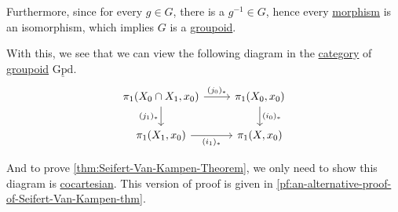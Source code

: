 Furthermore, since for every \(g\in G\), there is a \(g^{-1} \in G\), hence every \hyperref[def:morphism]{morphism} is an isomorphism, which implies \(G\) is a \hyperref[def:groupoid]{groupoid}.

With this, we see that we can view the following diagram in the \hyperref[def:category]{category} of \hyperref[def:groupoid]{groupoid} \(\underline{\mathrm{Gpd}}\).
\[
	\begin{tikzcd}
		{\pi_1(X_0\cap X_1, x_0)} & {\pi_1(X_0, x_0)} \\
		{\pi_1(X_1, x_0)} & {\pi_1(X, x_0)}
		\arrow["{(j_0)_\ast}", from=1-1, to=1-2]
		\arrow["{(i_0)_\ast}", from=1-2, to=2-2]
		\arrow["{(i_1)_\ast}"', from=2-1, to=2-2]
		\arrow["{(j_1)_\ast}"', from=1-1, to=2-1]
	\end{tikzcd}
\]

And to prove \autoref{thm:Seifert-Van-Kampen-Theorem}, we only need to show this diagram is \hyperref[def:cocartesian]{cocartesian}.
This version of proof is given in \autoref{pf:an-alternative-proof-of-Seifert-Van-Kampen-thm}.